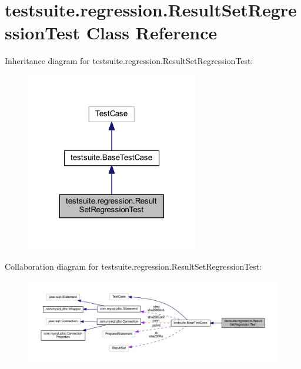 \hypertarget{classtestsuite_1_1regression_1_1_result_set_regression_test}{}\section{testsuite.\+regression.\+Result\+Set\+Regression\+Test Class Reference}
\label{classtestsuite_1_1regression_1_1_result_set_regression_test}


Inheritance diagram for testsuite.\+regression.\+Result\+Set\+Regression\+Test\+:
\nopagebreak
\begin{figure}[H]
\begin{center}
\leavevmode
\includegraphics[width=213pt]{classtestsuite_1_1regression_1_1_result_set_regression_test__inherit__graph}
\end{center}
\end{figure}


Collaboration diagram for testsuite.\+regression.\+Result\+Set\+Regression\+Test\+:
\nopagebreak
\begin{figure}[H]
\begin{center}
\leavevmode
\includegraphics[width=350pt]{classtestsuite_1_1regression_1_1_result_set_regression_test__coll__graph}
\end{center}
\end{figure}
